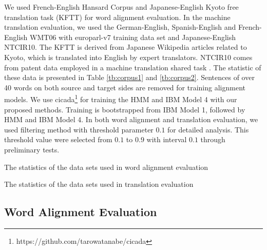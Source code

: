 \documentclass[english]{jnlp_1.4}
\begin{document}
We used French-English Hansard Corpus and Japanese-English Kyoto free translation task (KFTT) for word alignment evaluation.
In the machine translation evaluation, we used the German-English, Spanish-English and French-English WMT06 with europarl-v7 training data set and Japanese-English NTCIR10.
The KFTT \cite{neubig11kftt} is derived  from Japanese Wikipedia articles related to Kyoto, which is translated into English by expert translators.
NTCIR10 comes from patent data  employed in a machine translation shared task \cite{goto2013overview}.
The statistic of these data is presented in Table \ref{tb:corpus1} and \ref{tb:corpus2}.
Sentences of over 40 words on both source and target sides are removed for training alignment models.
We use cicada\footnote{https://github.com/tarowatanabe/cicada} for training the HMM and IBM Model 4 with our proposed methods.
Training is bootstrapped from IBM Model 1, followed by HMM and IBM Model 4.
In both word alignment and translation evaluation, we used filtering method \cite{liang-taskar-klein:2006:HLT-NAACL06-Main} with threshold parameter $0.1$ for detailed analysis.
This threshold value were selected from $0.1$ to $0.9$ with interval $0.1$ through preliminary tests.

\begin{table}[t]
\caption{The statistics of the data sets used in word alignment evaluation}
\label{tb:corpus1}

\end{table}
\begin{table}[t]
\caption{The statistics of the data sets used in translation evaluation}
\label{tb:corpus2}

\end{table}


\subsection{Word Alignment Evaluation}
\end{document}
